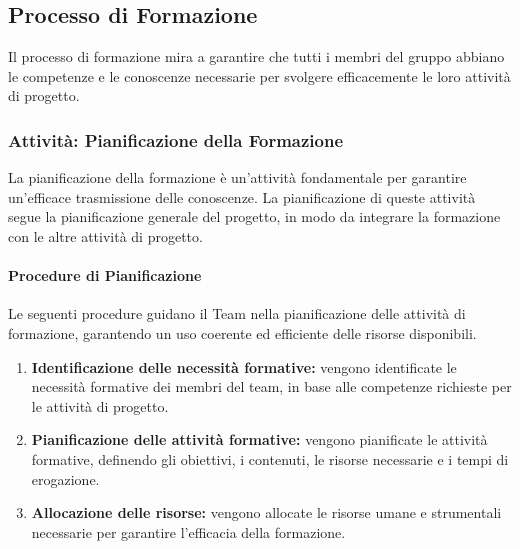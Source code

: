 \documentclass[a4paper,12pt]{article}
\begin{document}

\subsection{Processo di Formazione}
Il processo di formazione mira a garantire che tutti i membri del gruppo abbiano le competenze e le conoscenze necessarie per svolgere efficacemente le loro attività di progetto.

\subsubsection{Attività: Pianificazione della Formazione}
La pianificazione della formazione è un'attività fondamentale per garantire un'efficace trasmissione delle conoscenze. 
La pianificazione di queste attività segue la pianificazione generale del progetto, in modo da integrare la formazione con le altre attività di progetto.
\paragraph{Procedure di Pianificazione}
Le seguenti procedure guidano il Team nella pianificazione delle attività di
formazione, garantendo un uso coerente ed efficiente delle risorse
disponibili.
\begin{enumerate}
    \item \textbf{Identificazione delle necessità formative:} vengono identificate le necessità formative dei membri del team, in base alle competenze richieste per le attività di progetto.
    \item \textbf{Pianificazione delle attività formative:} vengono pianificate le attività formative, definendo gli obiettivi, i contenuti, le risorse necessarie e i tempi di erogazione.
    \item \textbf{Allocazione delle risorse:} vengono allocate le risorse umane e strumentali necessarie per garantire l'efficacia della formazione.
\end{enumerate}
\end{document}
